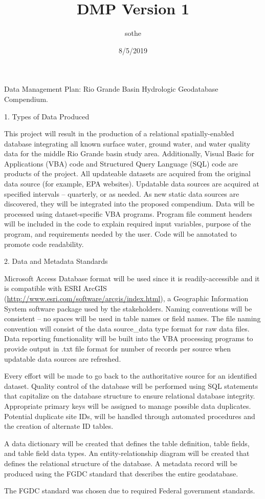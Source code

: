 \documentclass[ignorenonframetext,]{beamer}
\title{DMP Version 1}
\author{sothe}
\date{8/5/2019}
\begin{document}
\frame{\titlepage}

\begin{frame}{Data Management Plan: Rio Grande Basin Hydrologic
Geodatabase Compendium.}

\end{frame}

\begin{frame}{1. Types of Data Produced}

This project will result in the production of a relational
spatially-enabled database integrating all known surface water, ground
water, and water quality data for the middle Rio Grande basin study
area. Additionally, Visual Basic for Applications (VBA) code and
Structured Query Language (SQL) code are products of the project. All
updateable datasets are acquired from the original data source (for
example, EPA websites). Updatable data sources are acquired at specified
intervals -- quarterly, or as needed. As new static data sources are
discovered, they will be integrated into the proposed compendium. Data
will be processed using dataset‐specific VBA programs. Program file
comment headers will be included in the code to explain required input
variables, purpose of the program, and requirements needed by the user.
Code will be annotated to promote code readability.

\end{frame}

\begin{frame}{2. Data and Metadata Standards}

Microsoft Access Database format will be used since it is
readily-accessible and it is compatible with ESRI ArcGIS
(\url{http://www.esri.com/software/arcgis/index.html}), a Geographic
Information System software package used by the stakeholders. Naming
conventions will be consistent -- no spaces will be used in table names
or field names. The file naming convention will consist of the data
source\_data type format for raw data files. Data reporting
functionality will be built into the VBA processing programs to provide
output in .txt file format for number of records per source when
updatable data sources are refreshed.

Every effort will be made to go back to the authoritative source for an
identified dataset. Quality control of the database will be performed
using SQL statements that capitalize on the database structure to ensure
relational database integrity. Appropriate primary keys will be assigned
to manage possible data duplicates. Potential duplicate site IDs, will
be handled through automated procedures and the creation of alternate ID
tables.

A data dictionary will be created that defines the table definition,
table fields, and table field data types. An entity-relationship diagram
will be created that defines the relational structure of the database. A
metadata record will be produced using the FGDC standard that describes
the entire geodatabase.

The FGDC standard was chosen due to required Federal government
standards.

\end{frame}
\end{document}

